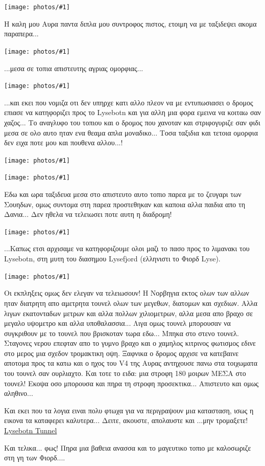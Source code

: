 \documentclass[11pt, letterpaper]{book}
\newcommand\photo[1]{\begin{center}\noindent\texttt{[image: photos/\#1]}\end{center}}
\begin{document}
\photo{190.jpg}

Η καλη μου Αυρα παντα διπλα μου συντροφος πιστος, ετοιμη να με ταξιδεψει ακομα παραπερα...

\photo{191.jpg}

...μεσα σε τοπια απιστευτης αγριας ομορφιας...

\photo{192.jpg}

...και εκει που νομιζα οτι δεν υπηρχε κατι αλλο πλεον να με εντυπωσιασει ο δρομος επιασε να κατηφοριζει προς το Lysebotn και για αλλη μια φορα εμεινα να κοιταω σαν χαζος...
Το αναγλυφο του τοπιου και ο δρομος που χανοταν και στριφογυριζε σαν φιδι μεσα σε ολο αυτο ηταν ενα θεαμα απλα μοναδικο... 
Τοσα ταξιδια και τετοια ομορφια δεν ειχα ποτε μου και πουθενα αλλου...!

\photo{193.jpg}
\photo{194.jpg}

Εδω και ωρα ταξιδευα μεσα στο απιστευτο αυτο τοπιο παρεα με το ζευγαρι των Σουηδων, ομως συντομα στη παρεα προστεθηκαν και καποια αλλα παιδια απο τη Δανια... Δεν ηθελα να τελειωσει ποτε αυτη η διαδρομη!

\photo{195.jpg}

...Καπως ετσι αρχισαμε να κατηφοριζουμε ολοι μαζι το πασο προς το λιμανακι του Lysebotn, στη μυτη του διασημου Lysefjord (ελληνιστι το Φιορδ Lyse).

\photo{196.jpg}

Οι εκπληξεις ομως δεν ελεγαν να τελειωσουν! Η Νορβηγια εκτος ολων των αλλων ηταν διατρητη απο αμετρητα τουνελ ολων των μεγεθων, διατομων και σχεδιων. Αλλα λιγων εκατονταδων μετρων και αλλα πολλων χιλιομετρων, αλλα μεσα απο βραχο σε μεγαλο υψομετρο και αλλα υποθαλασσια... Λιγα ομως τουνελ μπορουσαν να συγκριθουν με το τουνελ που βρισκοταν τωρα εδω... 
Μπηκα στο στενο τουνελ. 
Σταγονες νερου επεφταν απο το γυμνο βραχο και ο χαμηλος κιτρινος φωτισμος εδινε στο μερος μια σχεδον τρομακτικη οψη.
Ξαφνικα ο δρομος αρχισε να κατεβαινε αποτομα προς τα κατω και ο ηχος του V4 της Αυρας αντηχουσε πανω στα τοιχωματα του τουνελ σαν ουρλιαχτο. Και τοτε το ειδα: μια στροφη 180 μοιρων ΜΕΣΑ στο τουνελ! Εκοψα οσο μπορουσα και πηρα τη στροφη προσεκτικα... Απιστευτο και ομως αληθινο...

Και εκει που τα λογια ειναι πολυ φτωχα για να περιγραψουν μια κατασταση, ισως η εικονα τα καταφερει καλυτερα...
Δειτε, ακουστε, απολαυστε και ...μην τρομαξετε! \href{http://www.youtube.com/watch?v=Gt4kouWnKh0}{Lysebotn Tunnel}

Και τελικα... φως! Πηρα μια βαθεια ανασσα και το μαγευτικο τοπιο με καλοσωριζε στη γη των Φιορδ....
\end{document}
